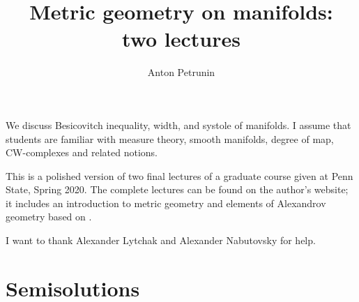 \documentclass[twoside]{book}
\begin{document}
 
\title{Metric geometry on manifolds:
\\ two lectures}
\author{Anton Petrunin}
\date{}
\maketitle

We discuss Besicovitch inequality, width, and systole of manifolds.
I assume that students are familiar with 
measure theory,
smooth manifolds,
degree of map, 
CW-complexes and related notions.

This is a polished version of two final lectures of a graduate course given at Penn State, Spring 2020.
The complete lectures can be found on the author's website;
it includes an introduction to metric geometry \cite{petrunin2020pure}
and elements of Alexandrov geometry based on \cite{alexander-kapovitch-petrunin-2019}.

I want to thank Alexander Lytchak and Alexander Nabutovsky for help.

\thispagestyle{empty}
\tableofcontents
\thispagestyle{empty}

%



%
%
%
\appendix
\chapter{Semisolutions}


%
{\small\sloppy


\def\emph{\textit}

\printbibliography[heading=bibintoc]
\fussy
}
\end{document}
